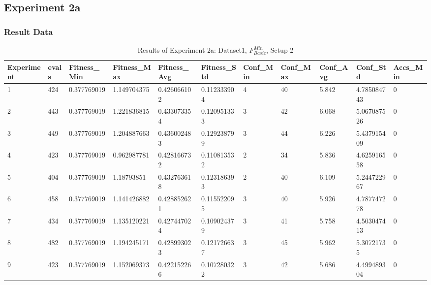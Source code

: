 	\subsection{Experiment 2a}
	\label{sec:A_Exp2a}
		\subsubsection{Result Data}
		\label{sec:A_Exp2a_Data}	
			\begin{table}[H]
			\caption{Results of Experiment 2a: Dataset1, $F_{Basic}^{Min}$, Setup 2}
			\label{tab:A_Exp2a_Data}
				\begin{adjustbox}{max width=380pt,keepaspectratio,angle=90}
					\begin{tabular}{|l|l|l|l|l|l|l|l|l|l|l|}
						\rowcolor[HTML]{EFEFEF} 
						\hline
						Experiment & evals & Fitness\_Min & Fitness\_Max & Fitness\_Avg & Fitness\_Std & Conf\_Min & Conf\_Max & Conf\_Avg & Conf\_Std   & Accs\_Min \\ \hline
						1          & 424   & 0.377769019  & 1.149704375  & 0.426066102  & 0.112333904  & 4         & 40        & 5.842     & 4.785084743 & 0         \\ \hline
						2          & 443   & 0.377769019  & 1.221836815  & 0.433073354  & 0.120951333  & 3         & 42        & 6.068     & 5.067087526 & 0         \\ \hline
						3          & 449   & 0.377769019  & 1.204887663  & 0.436002483  & 0.129238799  & 3         & 44        & 6.226     & 5.437915409 & 0         \\ \hline
						4          & 423   & 0.377769019  & 0.962987781  & 0.428166732  & 0.110813532  & 2         & 34        & 5.836     & 4.625916558 & 0         \\ \hline
						5          & 404   & 0.377769019  & 1.18793851   & 0.432763618  & 0.123186393  & 2         & 40        & 6.109     & 5.244722967 & 0         \\ \hline
						6          & 458   & 0.377769019  & 1.141426882  & 0.428852621  & 0.115522095  & 3         & 40        & 5.926     & 4.787747278 & 0         \\ \hline
						7          & 434   & 0.377769019  & 1.135120221  & 0.427447024  & 0.109024379  & 3         & 41        & 5.758     & 4.503047413 & 0         \\ \hline
						8          & 482   & 0.377769019  & 1.194245171  & 0.428993023  & 0.121726637  & 3         & 45        & 5.962     & 5.30721735  & 0         \\ \hline
						9          & 423   & 0.377769019  & 1.152069373  & 0.422152266  & 0.107280322  & 3         & 42        & 5.686     & 4.499489304 & 0         \\ \hline

\end{tabular}
\end{adjustbox}
\end{table}
